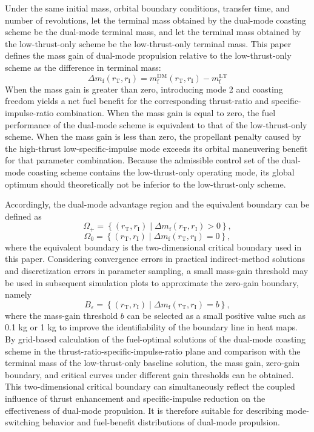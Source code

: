 ﻿\documentclass{IEEEtaes}
\begin{document}
Under the same initial mass, orbital boundary conditions, transfer time, and number of revolutions, let the terminal mass obtained by the dual-mode coasting scheme be the dual-mode terminal mass, and let the terminal mass obtained by the low-thrust-only scheme be the low-thrust-only terminal mass. This paper defines the mass gain of dual-mode propulsion relative to the low-thrust-only scheme as the difference in terminal mass:
\begin{equation}
\Delta m_{\mathrm{f}}(r_{\mathrm{T}},r_{\mathrm{I}})=m_{\mathrm{f}}^{\mathrm{DM}}(r_{\mathrm{T}},r_{\mathrm{I}})-m_{\mathrm{f}}^{\mathrm{LT}}
\end{equation}
When the mass gain is greater than zero, introducing mode 2 and coasting freedom yields a net fuel benefit for the corresponding thrust-ratio and specific-impulse-ratio combination. When the mass gain is equal to zero, the fuel performance of the dual-mode scheme is equivalent to that of the low-thrust-only scheme. When the mass gain is less than zero, the propellant penalty caused by the high-thrust low-specific-impulse mode exceeds its orbital maneuvering benefit for that parameter combination. Because the admissible control set of the dual-mode coasting scheme contains the low-thrust-only operating mode, its global optimum should theoretically not be inferior to the low-thrust-only scheme.

Accordingly, the dual-mode advantage region and the equivalent boundary can be defined as
\begin{equation}
\Omega_{+}=\left\{(r_{\mathrm{T}},r_{\mathrm{I}})\mid \Delta m_{\mathrm{f}}(r_{\mathrm{T}},r_{\mathrm{I}})>0\right\},
\end{equation}
\begin{equation}
\Omega_{0}=\left\{(r_{\mathrm{T}},r_{\mathrm{I}})\mid \Delta m_{\mathrm{f}}(r_{\mathrm{T}},r_{\mathrm{I}})=0\right\},
\end{equation}
where the equivalent boundary is the two-dimensional critical boundary used in this paper. Considering convergence errors in practical indirect-method solutions and discretization errors in parameter sampling, a small mass-gain threshold may be used in subsequent simulation plots to approximate the zero-gain boundary, namely
\begin{equation}
B_{\varepsilon}=\left\{(r_{\mathrm{T}},r_{\mathrm{I}})\mid \Delta m_{\mathrm{f}}(r_{\mathrm{T}},r_{\mathrm{I}})=b\right\},
\end{equation}
where the mass-gain threshold $b$ can be selected as a small positive value such as 0.1 kg or 1 kg to improve the identifiability of the boundary line in heat maps. By grid-based calculation of the fuel-optimal solutions of the dual-mode coasting scheme in the thrust-ratio-specific-impulse-ratio plane and comparison with the terminal mass of the low-thrust-only baseline solution, the mass gain, zero-gain boundary, and critical curves under different gain thresholds can be obtained. This two-dimensional critical boundary can simultaneously reflect the coupled influence of thrust enhancement and specific-impulse reduction on the effectiveness of dual-mode propulsion. It is therefore suitable for describing mode-switching behavior and fuel-benefit distributions of dual-mode propulsion.
\end{document}

